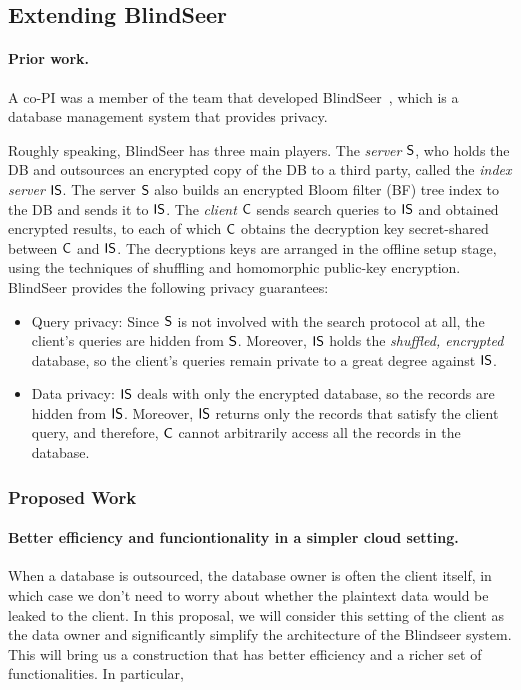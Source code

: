 \subsection{Extending BlindSeer}
\label{sec:ext-blindseer}

\paragraph{Prior work.} A co-PI was a member of the team that developed
BlindSeer~\cite{SP:PKVKMC14,SP:FVKKKM15}, which is a database management system
that provides privacy.

Roughly speaking, BlindSeer has three main players. The {\em server} $\sf S$,
who holds the DB and outsources an encrypted copy of the DB to a third party,
called the {\em index server} $\sf IS$. The server $\sf S$  also builds an
encrypted Bloom filter (BF) tree index to the DB and sends it to $\sf IS$. The
{\em client} $\sf C$ sends search queries to $\sf IS$ and obtained encrypted
results, to each of which $\sf C$ obtains the decryption key secret-shared
between $\sf C$ and $\sf IS$. The decryptions keys are arranged in the offline
setup stage, using the techniques of shuffling and homomorphic public-key
encryption.
%
BlindSeer provides the following privacy guarantees:
\begin{itemize}
\item Query privacy: Since $\sf S$ is not involved with the search protocol at
  all, the client's queries are hidden from $\sf S$. Moreover, $\sf IS$ holds
    the {\em shuffled, encrypted} database, so the client's queries remain
    private to a great degree against $\sf IS$. 

\item Data privacy: $\sf IS$ deals with only the encrypted database, so the
records are hidden from $\sf IS$. Moreover, $\sf IS$ returns only the records
that satisfy the client query, and therefore, $\sf C$ cannot arbitrarily access
all the records in the database.  
\end{itemize}

\subsubsection{Proposed Work}

\paragraph{Better efficiency and funciontionality in a simpler cloud
setting.} When a database is outsourced, the database owner is often the client
itself, in which case we don't need to worry about whether the plaintext data
would be leaked to the client.  In this proposal, we will consider this setting
of the client as the data owner and significantly simplify the architecture of
the Blindseer system. This will bring us a construction that has better
efficiency and a richer set of functionalities. In particular,

